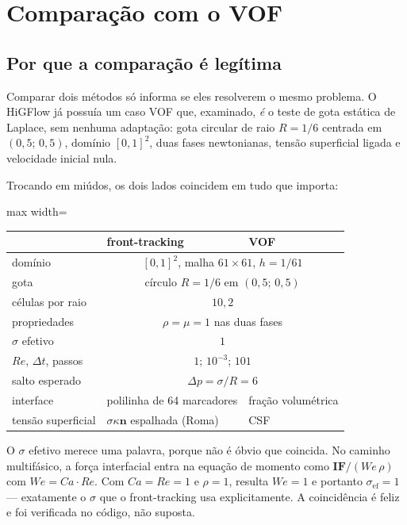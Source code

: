 \section{Compara\c{c}\~ao com o VOF}
\label{sec:comparacao}

\subsection{Por que a compara\c{c}\~ao \'e leg\'itima}

Comparar dois m\'etodos s\'o informa se eles resolverem o mesmo problema. O
HiGFlow j\'a possu\'ia um caso VOF que, examinado, \emph{\'e} o teste de gota
est\'atica de Laplace, sem nenhuma adapta\c{c}\~ao: gota circular de raio
$R=1/6$ centrada em $(0{,}5;\,0{,}5)$, dom\'inio $[0,1]^2$, duas fases
newtonianas, tens\~ao superficial ligada e velocidade inicial nula.

Trocando em mi\'udos, os dois lados coincidem em tudo que importa:

\begin{center}
\begin{adjustbox}{max width=\linewidth}
\begin{tabular}{lll}
\toprule
 & front-tracking & VOF \\
\midrule
dom\'inio            & \multicolumn{2}{c}{$[0,1]^2$, malha $61\times61$, $h=1/61$} \\
gota                 & \multicolumn{2}{c}{c\'irculo $R=1/6$ em $(0{,}5;\,0{,}5)$} \\
c\'elulas por raio   & \multicolumn{2}{c}{$10{,}2$} \\
propriedades         & \multicolumn{2}{c}{$\rho=\mu=1$ nas duas fases} \\
$\sigma$ efetivo     & \multicolumn{2}{c}{$1$} \\
$Re$, $\Delta t$, passos & \multicolumn{2}{c}{$1$; $10^{-3}$; $101$} \\
salto esperado       & \multicolumn{2}{c}{$\Delta p = \sigma/R = 6$} \\
\midrule
interface            & polilinha de 64 marcadores & fra\c{c}\~ao volum\'etrica \\
tens\~ao superficial & $\sigma\kappa\mathbf{n}$ espalhada (Roma) & CSF~\cite{brackbill1992} \\
\bottomrule
\end{tabular}
\end{adjustbox}
\end{center}

O $\sigma$ efetivo merece uma palavra, porque n\~ao \'e \'obvio que coincida. No
caminho multif\'asico, a for\c{c}a interfacial entra na equa\c{c}\~ao de momento
como $\mathbf{IF}/(We\,\rho)$ com $We = Ca\cdot Re$. Com $Ca=Re=1$ e $\rho=1$,
resulta $We=1$ e portanto $\sigma_{\text{ef}}=1$ --- exatamente o $\sigma$ que o
front-tracking usa explicitamente. A coincid\^encia \'e feliz e foi verificada no
c\'odigo, n\~ao suposta.

